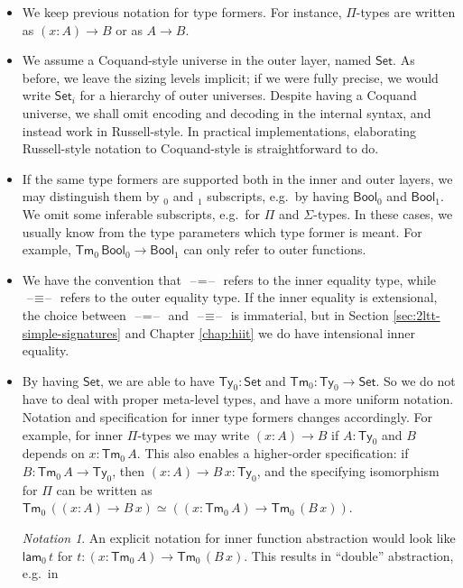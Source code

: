 \documentclass[12pt,a4paper,twoside,openany]{book}
\theoremstyle{remark}
\newtheorem{notation}{Notation}
\theoremstyle{definition}
\theoremstyle{theorem}
\newcommand{\ms}[1]{\mathsf{#1}}
\newcommand{\Tm}{\mathsf{Tm}}
\newcommand{\Ty}{\mathsf{Ty}}
\newcommand{\blank}{\mathord{\hspace{1pt}\text{--}\hspace{1pt}}}
\newcommand{\Set}{\mathsf{Set}}
\newcommand{\Bool}{\ms{Bool}}
\newcommand{\lam}{\ms{lam}}
\begin{document}
\begin{itemize}
  \item
    We keep previous notation for type formers. For instance, $\Pi$-types are
    written as $(x : A) \to B$ or as $A \to B$.
  \item
    We assume a Coquand-style universe in the outer layer, named $\Set$. As
    before, we leave the sizing levels implicit; if we were fully precise, we
    would write $\Set_i$ for a hierarchy of outer universes. Despite having a
    Coquand universe, we shall omit encoding and decoding in the internal
    syntax, and instead work in Russell-style. In practical implementations,
    elaborating Russell-style notation to Coquand-style is straightforward to
    do.
  \item
    If the same type formers are supported both in the inner and outer layers, we
    may distinguish them by $_0$ and $_1$ subscripts, e.g.\ by having $\Bool_0$ and
    $\Bool_1$. We omit some inferable subscripts, e.g.\ for $\Pi$ and
    $\Sigma$-types. In these cases, we usually know from the type parameters which
    type former is meant. For example, $\Tm_0\,\Bool_0 \to \Bool_1$ can only refer
    to outer functions.
  \item
    We have the convention that $\blank\!=\!\blank$ refers to the inner equality
    type, while $\blank\!\equiv\!\blank$ refers to the outer equality type. If
    the inner equality is extensional, the choice between
    $\blank\!=\!\blank$ and $\blank\!\equiv\!\blank$ is immaterial, but in
    Section \ref{sec:2ltt-simple-signatures} and Chapter \ref{chap:hiit} we do
    have intensional inner equality.
  \item
    By having $\Set$, we are able to have $\Ty_0 : \Set$ and $\Tm_0 : \Ty_0 \to
    \Set$. So we do not have to deal with proper meta-level types, and have a
    more uniform notation. Notation and specification for inner type formers
    changes accordingly. For example, for inner $\Pi$-types we may write $(x :
    A) \to B$ if $A : \Ty_0$ and $B$ depends on $x : \Tm_0\,A$. This also
    enables a higher-order specification: if $B : \Tm_0\,A \to \Ty_0$, then $(x
    : A) \to B\,x : \Ty_0$, and the specifying isomorphism for $\Pi$ can be
    written as $\Tm_0\,((x : A) \to B\,x) \simeq ((x : \Tm_0\,A) \to
    \Tm_0\,(B\,x))$.
    \begin{notation}
      An explicit notation for inner function abstraction would look like
      $\lam_0\,t$ for $t : (x : \Tm_0\,A) \to \Tm_0\,(B\,x)$. This results in
      ``double'' abstraction, e.g.\ in

\end{notation}
\end{itemize}
\end{document}
